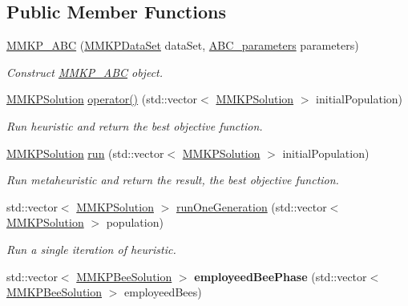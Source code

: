 \subsection*{Public Member Functions}
\begin{DoxyCompactItemize}
\item 
\hyperlink{class_m_m_k_p___a_b_c_a4dabcc8155d17c5ddc984dfd1307b4d0}{M\+M\+K\+P\+\_\+\+A\+B\+C} (\hyperlink{class_m_m_k_p_data_set}{M\+M\+K\+P\+Data\+Set} data\+Set, \hyperlink{class_a_b_c__parameters}{A\+B\+C\+\_\+parameters} parameters)
\begin{DoxyCompactList}\small\item\em Construct \hyperlink{class_m_m_k_p___a_b_c}{M\+M\+K\+P\+\_\+\+A\+B\+C} object. \end{DoxyCompactList}\item 
\hyperlink{class_m_m_k_p_solution}{M\+M\+K\+P\+Solution} \hyperlink{class_m_m_k_p___a_b_c_ad7777f81bbb05359ea884d7cd57df0f7}{operator()} (std\+::vector$<$ \hyperlink{class_m_m_k_p_solution}{M\+M\+K\+P\+Solution} $>$ initial\+Population)
\begin{DoxyCompactList}\small\item\em Run heuristic and return the best objective function. \end{DoxyCompactList}\item 
\hypertarget{class_m_m_k_p___a_b_c_afb60fe316bf761a5cc2a068fab9a15d1}{\hyperlink{class_m_m_k_p_solution}{M\+M\+K\+P\+Solution} \hyperlink{class_m_m_k_p___a_b_c_afb60fe316bf761a5cc2a068fab9a15d1}{run} (std\+::vector$<$ \hyperlink{class_m_m_k_p_solution}{M\+M\+K\+P\+Solution} $>$ initial\+Population)}\label{class_m_m_k_p___a_b_c_afb60fe316bf761a5cc2a068fab9a15d1}

\begin{DoxyCompactList}\small\item\em Run metaheuristic and return the result, the best objective function. \end{DoxyCompactList}\item 
\hypertarget{class_m_m_k_p___a_b_c_a3f405cbe0f90959d1f55bea4211476d4}{std\+::vector$<$ \hyperlink{class_m_m_k_p_solution}{M\+M\+K\+P\+Solution} $>$ \hyperlink{class_m_m_k_p___a_b_c_a3f405cbe0f90959d1f55bea4211476d4}{run\+One\+Generation} (std\+::vector$<$ \hyperlink{class_m_m_k_p_solution}{M\+M\+K\+P\+Solution} $>$ population)}\label{class_m_m_k_p___a_b_c_a3f405cbe0f90959d1f55bea4211476d4}

\begin{DoxyCompactList}\small\item\em Run a single iteration of heuristic. \end{DoxyCompactList}\item 
\hypertarget{class_m_m_k_p___a_b_c_af4c67bc91937841cb32510de2e10ba84}{std\+::vector$<$ \hyperlink{struct_m_m_k_p_bee_solution}{M\+M\+K\+P\+Bee\+Solution} $>$ {\bfseries employeed\+Bee\+Phase} (std\+::vector$<$ \hyperlink{struct_m_m_k_p_bee_solution}{M\+M\+K\+P\+Bee\+Solution} $>$ employeed\+Bees)}\label{class_m_m_k_p___a_b_c_af4c67bc91937841cb32510de2e10ba84}


\end{DoxyCompactItemize}
